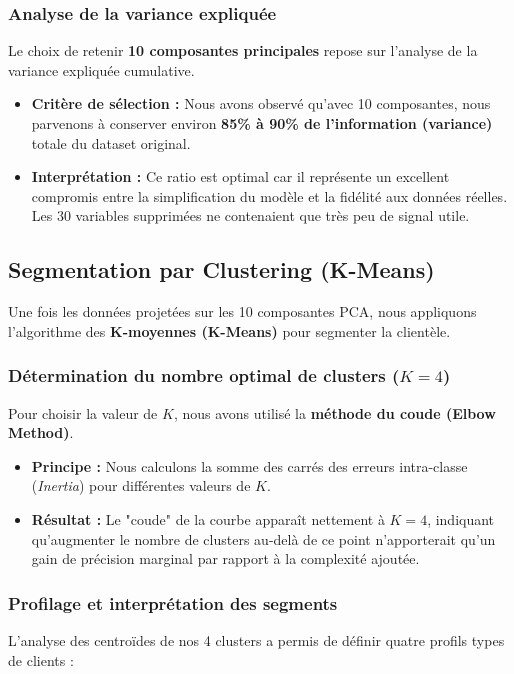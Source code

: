 \documentclass[11pt,a4paper]{article}
\begin{document}
\subsubsection{Analyse de la variance expliquée}
Le choix de retenir \textbf{10 composantes principales} repose sur l'analyse de la variance expliquée cumulative. 
\begin{itemize}
    \item \textbf{Critère de sélection :} Nous avons observé qu'avec 10 composantes, nous parvenons à conserver environ \textbf{85\% à 90\% de l'information (variance)} totale du dataset original. 
    \item \textbf{Interprétation :} Ce ratio est optimal car il représente un excellent compromis entre la simplification du modèle et la fidélité aux données réelles. Les 30 variables supprimées ne contenaient que très peu de signal utile.
\end{itemize}

\subsection{Segmentation par Clustering (K-Means)}
Une fois les données projetées sur les 10 composantes PCA, nous appliquons l'algorithme des \textbf{K-moyennes (K-Means)} pour segmenter la clientèle.

\subsubsection{Détermination du nombre optimal de clusters ($K=4$)}
Pour choisir la valeur de $K$, nous avons utilisé la \textbf{méthode du coude (Elbow Method)}. 
\begin{itemize}
    \item \textbf{Principe :} Nous calculons la somme des carrés des erreurs intra-classe (\textit{Inertia}) pour différentes valeurs de $K$.
    \item \textbf{Résultat :} Le "coude" de la courbe apparaît nettement à $K=4$, indiquant qu'augmenter le nombre de clusters au-delà de ce point n'apporterait qu'un gain de précision marginal par rapport à la complexité ajoutée.
\end{itemize}

\subsubsection{Profilage et interprétation des segments}
L'analyse des centroïdes de nos 4 clusters a permis de définir quatre profils types de clients :
\end{document}
